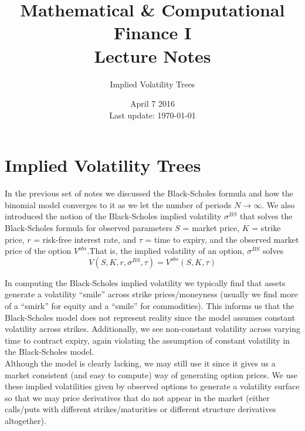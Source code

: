 \documentclass[12pt]{article}
\newlength\tindent
\renewcommand{\indent}{\hspace*{\tindent}}
\begin{document}
 
 
\title{Mathematical \& Computational Finance I\\Lecture Notes}
\author{Implied Volatility Trees}
\date{April 7 2016 \\ Last update: \today{}}
\maketitle

\section{Implied Volatility Trees}

\indent In the previous set of notes we discussed the Black-Scholes formula and how the binomial model converges to it as we let the number of periods $N\to\infty$. We also introduced the notion of the Black-Scholes implied volatility $\sigma^{BS}$ that solves the Black-Scholes formula for observed parameters $S$ = market price, $K$ = strike price, $r$ = risk-free interest rate, and $\tau$ = time to expiry, and the observed market price of the option $V^{obs}$.That is, the implied volatility of an option, $\sigma^{BS}$ solves
\begin{equation*}
	V(S, K, r, \sigma^{BS}, \tau) = V^{obs}(S, K, \tau)
\end{equation*}

\indent In computing the Black-Scholes implied volatility we typically find that assets generate a volatility ``smile'' across strike prices/moneyness (usually we find more of a ``smirk'' for equity and a ``smile'' for commodities). This informs us that the Black-Scholes model does not represent reality since the model assumes constant volatility across strikes. Additionally, we see non-constant volatility across varying time to contract expiry, again violating the assumption of constant volatility in the Black-Scholes model. \\

\indent Although the model is clearly lacking, we may still use it since it gives us a market consistent (and easy to compute) way of generating option prices. We use these implied volatilities given by observed options to generate a volatility surface so that we may price derivatives that do not appear in the market (either calls/puts with different strikes/maturities or different structure derivatives altogether). \\
\end{document}
